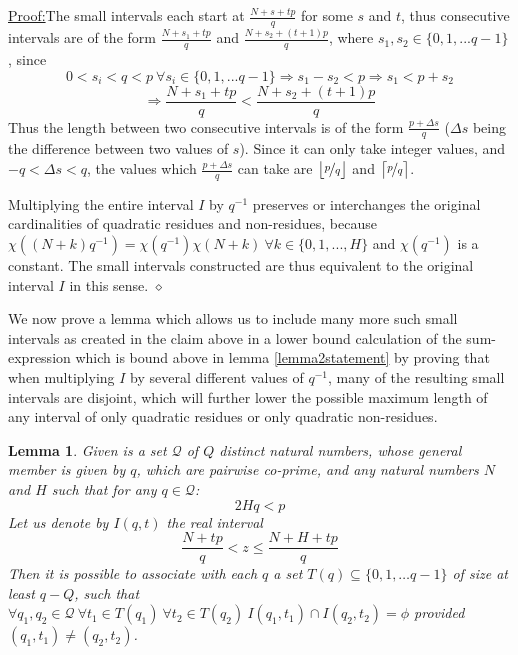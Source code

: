 \documentclass{report}
\newtheorem{lemma}{Lemma}
\newenvironment{claimproof}[1]{\vspace{2.5mm}\par\noindent\underline{Proof:}\space#1}{\hfill $\diamond$ \vspace{2.5mm} \par}
\begin{document}
\begin{claimproof}
The small intervals each start at $\frac{N+s+tp}{q}$ for some $s$ and $t$, thus consecutive intervals are of the form $\frac{N+s_1+tp}{q}$ and $\frac{N+s_2+(t+1)p}{q}$, where $s_1,s_2\in \{0,1,...q-1\}$, since
\[0<s_i<q<p \ \forall s_i\! \in \! \{0,1,...q-1\}\Rightarrow s_1-s_2 < p \Rightarrow s_1 < p + s_2\]
\[ \Rightarrow \frac{N+s_1+tp}{q}<\frac{N+s_2+(t+1)p}{q}\]
Thus the length between two consecutive intervals is of the form $\frac{p+\Delta s}{q}$ ($\Delta s$ being the difference between two values of $s$). Since it can only take integer values, and $-q<\Delta s<q$, the values which $\frac{p+\Delta s}{q}$ can take are $\big \lfloor\nicefrac{p}{q}\big\rfloor$ and $\big \lceil \nicefrac {p}{q}\big\rceil$.

Multiplying the entire interval $I$ by $q^{-1}$ preserves or interchanges the original cardinalities of quadratic residues and non-residues, because $\chi((N+k)q^{-1})=\chi(q^{-1})\chi(N+k)\ \forall k \in \{0,1,...,H\}$ and $\chi(q^{-1})$ is a constant. The small intervals constructed are thus equivalent to the original interval $I$ in this sense.
\end{claimproof}
We now prove a lemma which allows us to include many more such small intervals as created in the claim above in a lower bound calculation of the sum-expression which is bound above in lemma \ref{lemma2statement} by proving that when multiplying $I$ by several different values of $q^{-1}$, many of the resulting small intervals are disjoint, which will further lower the possible maximum length of any interval of only quadratic residues or only quadratic non-residues.
%
\begin{lemma}
\textup{\cite{burgess}}Given is a set $\mathcal{Q}$ of $Q$ distinct natural numbers, whose general member is given by $q$, which are pairwise co-prime, and any natural numbers $N$ and $H$ such that for any $q\in\mathcal{Q}$:
\begin{equation} \label{lemma3cond}
2Hq<p
\end{equation}
Let us denote by $I(q,t)$ the real interval
$$\frac{N+tp}{q} < z \leq \frac{N+H+tp}{q}$$
Then it is possible to associate with each $q$ a set $T(q)\subseteq \{0,1,\ldots q-1\}$ of size at least $q-Q$, such that $\forall q_1,q_2\! \in\! \mathcal{Q} \ \forall t_1\! \in\! T(q_1)\  \forall t_2\! \in\! T(q_2)\  I(q_1,t_1)\cap I(q_2,t_2) = \phi$ provided $(q_1,t_1) \neq (q_2,t_2)$.
\end{lemma}
\end{document}

